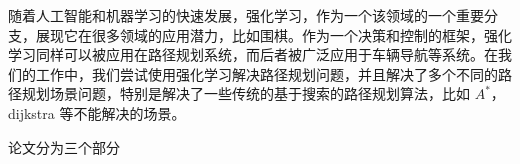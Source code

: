\documentclass{standalone}
\begin{document}
	
\begin{chineseabstract}
随着人工智能和机器学习的快速发展，强化学习，作为一个该领域的一个重要分支，展现它在很多领域的应用潜力，比如围棋。作为一个决策和控制的框架，强化学习同样可以被应用在路径规划系统，而后者被广泛应用于车辆导航等系统。在我们的工作中，我们尝试使用强化学习解决路径规划问题，并且解决了多个不同的路径规划场景问题，特别是解决了一些传统的基于搜索的路径规划算法，比如 $A^{*}$，dijkstra 等不能解决的场景。

论文分为三个部分

\end{chineseabstract}
\end{document}
